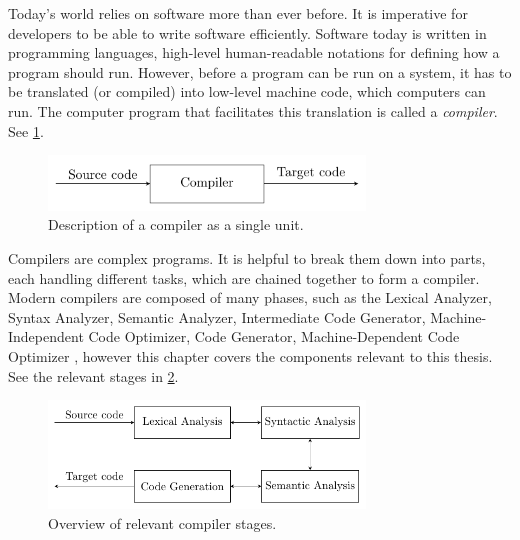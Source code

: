 Today's world relies on software more than ever before. It is imperative for developers to be able to write software efficiently. Software today is written in programming languages, high-level human-readable notations for defining how a program should run. However, before a program can be run on a system, it has to be translated (or compiled) into low-level machine code, which computers can run. The computer program that facilitates this translation is called a \emph{compiler}. See \cref{fig:compiler}.

\begin{figure}[H]
  \label{fig:compiler}
  \centering
  \includegraphics[width=0.75\textwidth]{figures/compiler.pdf}
  \caption{Description of a compiler as a single unit.}
\end{figure}



Compilers are complex programs. It is helpful to break them down into parts, each handling different tasks, which are chained together to form a compiler. Modern compilers are composed of many phases, such as the Lexical Analyzer, Syntax Analyzer, Semantic Analyzer, Intermediate Code Generator, Machine-Independent Code Optimizer, Code Generator, Machine-Dependent Code Optimizer \cite[p. 5]{dragon}, however this chapter covers the components relevant to this thesis. See the relevant stages in \cref{fig:compiler-stages}.


\begin{figure}[H]
 
  \label{fig:compiler-stages}
  \centering
  \includegraphics[width=0.75\textwidth]{figures/compiler-stages.pdf}
  \caption{Overview of relevant compiler stages.}
\end{figure}

